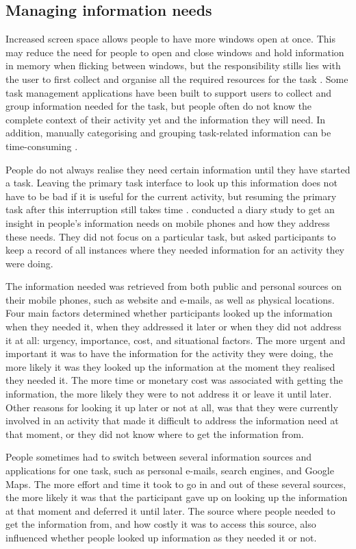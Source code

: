 \documentclass[11pt,oneside]{report}
\begin{document}
\subsection{Managing information needs}
Increased screen space allows people to have more windows open at once. This may reduce the need for people to open and close windows and hold information in memory when flicking between windows, but the responsibility stills lies with the user to first collect and organise all the required resources for the task \citep{Bardram2006}. Some task management applications have been built to support users to collect and group information needed for the task, but people often do not know the complete context of their activity yet and the information they will need. In addition, manually categorising and grouping task-related information can be time-consuming \citep{Cangiano2009}.

People do not always realise they need certain information until they have started a task. Leaving the primary task interface to look up this information does not have to be bad if it is useful for the current activity, but resuming the primary task after this interruption still takes time \citep{Rule2013}.
\citet{Sohn2008} conducted a diary study to get an insight in people's information needs on mobile phones and how they address these needs. They did not focus on a particular task, but asked participants to keep a record of all instances where they needed information for an activity they were doing.

The information needed was retrieved from both public and personal sources on their mobile phones, such as website and e-mails, as well as physical locations. Four main factors determined whether participants looked up the information when they needed it, when they addressed it later or when they did not address it at all: urgency, importance, cost, and situational factors. The more urgent and important it was to have the information for the activity they were doing, the more likely it was they looked up the information at the moment they realised they needed it. The more time or monetary cost was associated with getting the information, the more likely they were to not address it or leave it until later. Other reasons for looking it up later or not at all, was that they were currently involved in an activity that made it difficult to address the information need at that moment, or they did not know where to get the information from.

People sometimes had to switch between several information sources and applications for one task, such as personal e-mails, search engines, and Google Maps. The more effort and time it took to go in and out of these several sources, the more likely it was that the participant gave up on looking up the information at that moment and deferred it until later. The source where people needed to get the information from, and how costly it was to access this source, also influenced whether people looked up information as they needed it or not.
\end{document}
